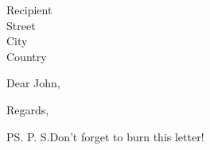 \documentclass[12pt]{chletter}  %
\author{Jämes Ménétrey}
\date{Location, \today}
\begin{document}
	
\begin{letter}{Recipient \\ Street \\ City \\ Country}
	

\opening{Dear John,}

\lipsum[1]

\closing{Regards,}



\ps{P. S.}{Don't forget to burn this letter!}

\end{letter}
\end{document}
